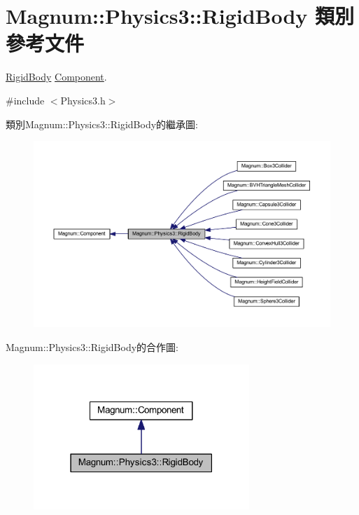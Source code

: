 \hypertarget{class_magnum_1_1_physics3_1_1_rigid_body}{}\section{Magnum\+:\+:Physics3\+:\+:Rigid\+Body 類別 參考文件}
\label{class_magnum_1_1_physics3_1_1_rigid_body}


\hyperlink{class_magnum_1_1_physics3_1_1_rigid_body}{Rigid\+Body} \hyperlink{class_magnum_1_1_component}{Component}.  




{\ttfamily \#include $<$Physics3.\+h$>$}



類別\+Magnum\+:\+:Physics3\+:\+:Rigid\+Body的繼承圖\+:\nopagebreak
\begin{figure}[H]
\begin{center}
\leavevmode
\includegraphics[width=350pt]{class_magnum_1_1_physics3_1_1_rigid_body__inherit__graph}
\end{center}
\end{figure}


Magnum\+:\+:Physics3\+:\+:Rigid\+Body的合作圖\+:\nopagebreak
\begin{figure}[H]
\begin{center}
\leavevmode
\includegraphics[width=231pt]{class_magnum_1_1_physics3_1_1_rigid_body__coll__graph}
\end{center}
\end{figure}
